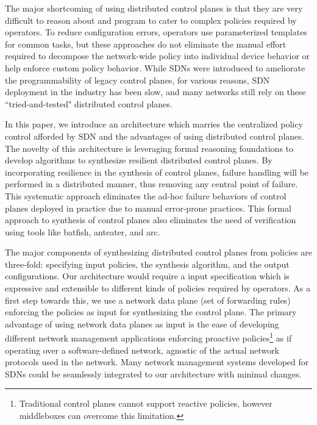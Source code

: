 The major shortcoming of using distributed control planes is that
they are very difficult to reason about and program to cater to 
complex policies required by operators. To reduce configuration 
errors, operators use parameterized templates for common
tasks, but these approaches do not eliminate the manual effort
required to decompose the network-wide policy into individual device
behavior or help enforce custom policy behavior. While SDNs 
were introduced to ameliorate the programmability of legacy control planes, 
for various reasons, 
SDN deployment in the industry has been slow, and many 
networks still rely on these ``tried-and-tested" distributed 
control planes. 



In this paper, we introduce an architecture which marries the centralized
policy control afforded by SDN and the advantages of using
distributed control planes. 
The novelty of this architecture is leveraging
formal reasoning foundations to develop algorithms to 
synthesize resilient distributed control planes. 
By incorporating resilience in the synthesis of 
control planes, failure handling will be 
performed in a distributed manner, thus removing any central point 
of failure. This systematic approach eliminates the ad-hoc failure behaviors of
control planes deployed in practice due to manual error-prone practices. This
formal approach to synthesis of control planes also eliminates the need of 
verification using tools like batfish, anteater, and arc. 

The major components of synthesizing distributed control planes from 
policies are three-fold: specifying input policies, the synthesis 
algorithm, and the output configurations.
Our architecture would require a input specification which is expressive 
and extensible to different kinds of policies required by operators. As a 
first step towards this, we use a network data plane (set of forwarding rules)
enforcing the policies as input for synthesizing the control plane. The primary 
advantage of using network data planes as input is the ease of developing
different network management applications enforcing proactive policies\footnote{
Traditional control planes cannot support reactive policies, however
middleboxes can overcome this limitation.} 
as if operating over a software-defined
network, agnostic of the actual network protocols used in the network. 
Many network management systems developed for SDNs could be seamlessly
integrated to our architecture with minimal changes. 

